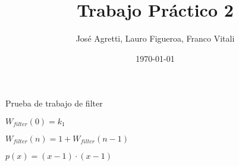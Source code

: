\documentclass[a4paper,12pt]{article}
\begin{document}
\title{Trabajo Práctico 2}
\author{José Agretti, Lauro Figueroa, Franco Vitali}
\date{\today}
\maketitle

\newpage

Prueba de trabajo de filter

$W_{filter} (0) = k_1$

$W_{filter} (n) = 1 + W_{filter} (n-1)$

\begin{math}
    p(x) = (x - 1) \cdot (x - 1)

\end{math}{}
\end{document}
